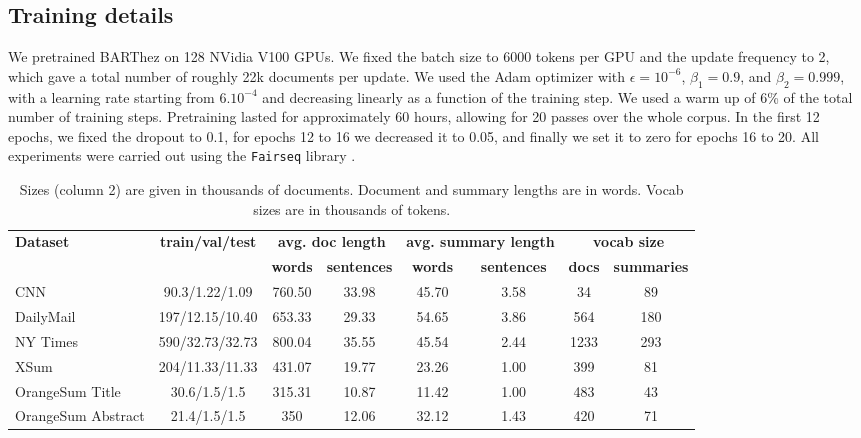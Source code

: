 \documentclass[11pt,a4paper]{article}
\begin{document}
\subsection{Training details}
We pretrained BARThez on 128 NVidia V100 GPUs. We fixed the batch size to 6000 tokens per GPU and the update frequency to 2, which gave a total number of roughly 22k documents per update.
We used the Adam optimizer \cite{kingma2014adam} with $\epsilon=10^{-6}$, $\beta_1=0.9$, and $\beta_2=0.999$, with a learning rate starting from $6.10^{-4}$ and decreasing linearly as a function of the training step.
We used a warm up of 6\% of the total number of training steps.
Pretraining lasted for approximately 60 hours, allowing for 20 passes over the whole corpus.
In the first 12 epochs, we fixed the dropout to 0.1, for epochs 12 to 16 we decreased it to 0.05, and finally we set it to zero for epochs 16 to 20.
All experiments were carried out using the \texttt{Fairseq} library \cite{ott2019fairseq}. 

\begin{table*}[ht]
\small
  \begin{center}{
  \begin{tabular}{| l | c | c c | c c | c c|}
    \hline
    \multirow{2}{*}{\textbf{Dataset}} & \multirow{2}{*}{\textbf{train/val/test}} & \multicolumn{2}{c|}{\textbf{avg. doc length}} & \multicolumn{2}{c|}{\textbf{avg. summary length}} & \multicolumn{2}{c|}{\textbf{vocab size}}\\
    & & \textbf{words} & \textbf{sentences} & \textbf{words} & \textbf{sentences} & \textbf{docs} & \textbf{summaries}\\ \hline 
    CNN &90.3/1.22/1.09&760.50&33.98&45.70&3.58&34&89 \\
    DailyMail &197/12.15/10.40&653.33&29.33&54.65&3.86&564&180 \\
    NY Times &590/32.73/32.73&800.04&35.55&45.54&2.44&1233&293 \\
    \hline
    XSum & 204/11.33/11.33&431.07&19.77&23.26&1.00&399&81 \\
    OrangeSum Title & 30.6/1.5/1.5 & 315.31 & 10.87 & 11.42 & 1.00 & 483 & 43 \\
    OrangeSum Abstract & 21.4/1.5/1.5 & 350 & 12.06 & 32.12 & 1.43 & 420 & 71 \\
    \hline
  \end{tabular}}
  \end{center}
  \caption{Sizes (column 2) are given in thousands of documents. Document and summary lengths are in words. Vocab sizes are in thousands of tokens. \label{table:orangesum_1}}
\end{table*}
\end{document}
